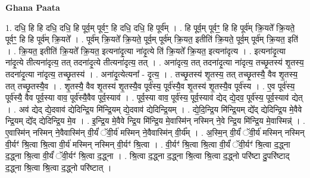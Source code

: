\documentclass[17pt]{extarticle}
\begin{document}
\textbf{Ghana Paata } \newline

1. दधि॒ हि हि दधि॒ दधि॒ हि पूर्व॒म् पूर्वꣳ॒॒ हि दधि॒ दधि॒ हि पूर्व᳚म् । . हि पूर्व॒म् पूर्वꣳ॒॒ हि हि पूर्व॑म् क्रि॒यते᳚ क्रि॒यते॒ पूर्वꣳ॒॒ हि हि पूर्व॑म् क्रि॒यते᳚ । . पूर्व॑म् क्रि॒यते᳚ क्रि॒यते॒ पूर्व॒म् पूर्व॑म् क्रि॒यत॒ इतीति॑ क्रि॒यते॒ पूर्व॒म् पूर्व॑म् क्रि॒यत॒ इति॑ । . क्रि॒यत॒ इतीति॑ क्रि॒यते᳚ क्रि॒यत॒ इत्यना॑दृ॒त्या ना॑दृ॒त्ये ति॑ क्रि॒यते᳚ क्रि॒यत॒ इत्यना॑दृत्य । . इत्यना॑दृ॒त्या ना॑दृ॒त्ये तीत्यना॑दृत्य॒ तत् तदना॑दृ॒त्ये तीत्यना॑दृत्य॒ तत् । . अना॑दृत्य॒ तत् तदना॑दृ॒त्या ना॑दृत्य॒ तच्छृ॒तस्य॑ शृ॒तस्य॒ तदना॑दृ॒त्या ना॑दृत्य॒ तच्छृ॒तस्य॑ । . अना॑दृ॒त्येत्यना᳚ - दृ॒त्य॒ । . तच्छृ॒तस्य॑ शृ॒तस्य॒ तत् तच्छृ॒तस्यै॒ वैव शृ॒तस्य॒ तत् तच्छृ॒तस्यै॒व । . शृ॒तस्यै॒ वैव शृ॒तस्य॑ शृ॒तस्यै॒व पूर्व॑स्य॒ पूर्व॑स्यै॒व शृ॒तस्य॑ शृ॒तस्यै॒व पूर्व॑स्य । . ए॒व पूर्व॑स्य॒ पूर्व॑स्यै॒ वैव पूर्व॒स्या वाव॒ पूर्व॑स्यै॒वैव पूर्व॒स्याव॑ । . पूर्व॒स्या वाव॒ पूर्व॑स्य॒ पूर्व॒स्याव॑ द्येद् द्ये॒दव॒ पूर्व॑स्य॒ पूर्व॒स्याव॑ द्येत् । . अव॑ द्येद् द्ये॒दवाव॑ द्येदिन्द्रि॒य मि॑न्द्रि॒यम् द्ये॒दवाव॑ द्येदिन्द्रि॒यम् । . द्ये॒दि॒न्द्रि॒य मि॑न्द्रि॒यम् द्ये᳚द् द्येदिन्द्रि॒य मे॒वैवे न्द्रि॒यम् द्ये᳚द् द्येदिन्द्रि॒य मे॒व । . इ॒न्द्रि॒य मे॒वैवे न्द्रि॒य मि॑न्द्रि॒य मे॒वास्मि॑न् नस्मिन् ने॒वे न्द्रि॒य मि॑न्द्रि॒य मे॒वास्मिन्न्॑ । . ए॒वास्मि॑न् नस्मिन् ने॒वैवास्मि॑न् वी॒र्यं॑ ॅवी॒र्य॑ मस्मिन् ने॒वैवास्मि॑न् वी॒र्य᳚म् । . अ॒स्मि॒न् वी॒र्यं॑ ॅवी॒र्य॑ मस्मिन् नस्मिन् वी॒र्यꣳ॑ श्रि॒त्वा श्रि॒त्वा वी॒र्य॑ मस्मिन् नस्मिन् वी॒र्यꣳ॑ श्रि॒त्वा । . वी॒र्यꣳ॑ श्रि॒त्वा श्रि॒त्वा वी॒र्यं॑ ॅवी॒र्यꣳ॑ श्रि॒त्वा द॒द्ध्ना द॒द्ध्ना श्रि॒त्वा वी॒र्यं॑ ॅवी॒र्यꣳ॑ श्रि॒त्वा द॒द्ध्ना । . श्रि॒त्वा द॒द्ध्ना द॒द्ध्ना श्रि॒त्वा श्रि॒त्वा द॒द्ध्नो परि॑ष्टा दु॒परि॑ष्टाद् द॒द्ध्ना श्रि॒त्वा श्रि॒त्वा द॒द्ध्नो परि॑ष्टात् । \newline
\end{document}
